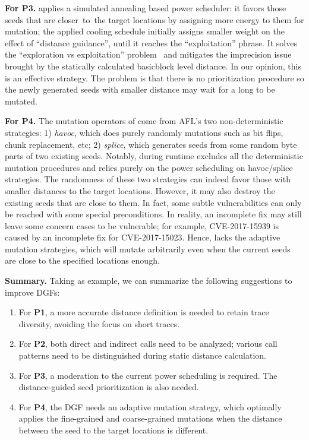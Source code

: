 \textbf{For P3. } 
\aflgo applies a simulated annealing based power scheduler: it favors those seeds that are closer~to~the target locations by assigning more energy to them for mutation; the applied cooling schedule initially assigns smaller weight on the effect of ``distance guidance'', until it reaches the ``exploitation'' phrase. It solves the ``exploration vs exploitation'' problem~\cite{eve} and mitigates the imprecision issue brought by the statically calculated basicblock level distance. In our opinion, this is an effective strategy. The problem is that there is no prioritization procedure so the newly generated seeds with smaller distance may wait for a long to be mutated.


 
\textbf{For P4. } The mutation operators of \aflgo come from AFL's two non-deterministic strategies: 1) \emph{havoc}, which does purely randomly mutations such as bit flips, chunk replacement, etc; 2) \emph{splice}, which generates seeds from some random byte parts of two existing seeds. 
Notably, during runtime \aflgo excludes all the deterministic mutation procedures and relies purely on the power scheduling on havoc/splice strategies.
The randomness of these two strategies can indeed favor those with smaller distances to the target locations.
However, it may also destroy the existing seeds that are close to them.
In fact, some subtle vulnerabilities can only be reached with some special preconditions. In reality, an incomplete fix may still leave some concern cases to be vulnerable; for example, CVE-2017-15939 is caused by an incomplete fix for CVE-2017-15023.
Hence, \aflgo lacks the adaptive mutation strategies, which will mutate arbitrarily even when the current seeds are close to the specified locations enough.


\textbf{Summary.} Taking \aflgo as example, we can summarize the following suggestions to improve DGFs:

\begin{enumerate}[(1)] 
	\itemsep0em
	\item For \textbf{P1}, a more accurate distance definition is needed to retain trace diversity, avoiding the focus on short traces.
	\item For \textbf{P2}, both direct and indirect calls need to be analyzed; various call patterns need to be distinguished during static distance calculation.
	\item For \textbf{P3}, a moderation to the current power scheduling is required. The distance-guided seed prioritization is also needed. 
	\item For \textbf{P4}, the DGF needs an adaptive mutation strategy, which optimally applies the fine-grained and coarse-grained mutations when the distance between the seed to the target locations is different.
\end{enumerate}


